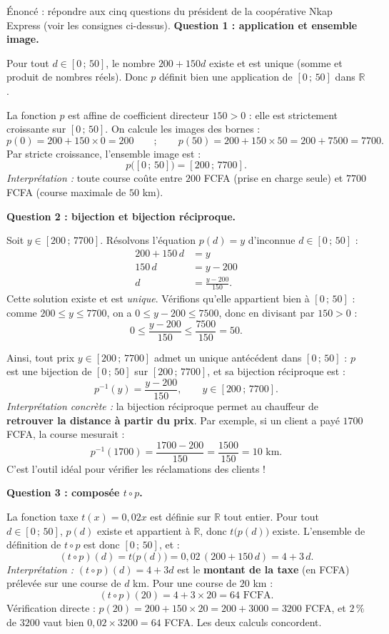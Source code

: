\documentclass[11pt]{article}
\newcommand{\cle}[1]{{\popxbold\color{popdark}#1}}
\begin{document}
\begin{exoresolu}
Énoncé : répondre aux cinq questions du président de la coopérative \og Nkap Express \fg{} (voir les consignes ci-dessus).
\tcblower
\textbf{Question 1 : application et ensemble image.}

Pour tout $d \in [0\,;\,50]$, le nombre $200 + 150d$ existe et est unique (somme et produit de nombres réels). Donc $p$ définit bien une \cle{application} de $[0\,;\,50]$ dans $\mathbb{R}$.

La fonction $p$ est affine de coefficient directeur $150 > 0$ : elle est strictement croissante sur $[0\,;\,50]$. On calcule les images des bornes :
\[ p(0) = 200 + 150 \times 0 = 200 \qquad ; \qquad p(50) = 200 + 150 \times 50 = 200 + 7500 = 7700. \]
Par stricte croissance, l'ensemble image est :
\[ p\bigl([0\,;\,50]\bigr) = [200\,;\,7700]. \]
\emph{Interprétation :} toute course coûte entre $200$ FCFA (prise en charge seule) et $7700$ FCFA (course maximale de $50$ km).

\medskip
\textbf{Question 2 : bijection et bijection réciproque.}

Soit $y \in [200\,;\,7700]$. Résolvons l'équation $p(d) = y$ d'inconnue $d \in [0\,;\,50]$ :
\begin{align*}
200 + 150\,d &= y \\
150\,d &= y - 200 \\
d &= \frac{y - 200}{150}.
\end{align*}
Cette solution existe et est \emph{unique}. Vérifions qu'elle appartient bien à $[0\,;\,50]$ : comme $200 \leq y \leq 7700$, on a $0 \leq y - 200 \leq 7500$, donc en divisant par $150 > 0$ :
\[ 0 \leq \frac{y-200}{150} \leq \frac{7500}{150} = 50. \]

Ainsi, tout prix $y \in [200\,;\,7700]$ admet un unique antécédent dans $[0\,;\,50]$ : $p$ est une \cle{bijection} de $[0\,;\,50]$ sur $[200\,;\,7700]$, et sa bijection réciproque est :
\[ p^{-1}(y) = \frac{y - 200}{150}, \qquad y \in [200\,;\,7700]. \]
\emph{Interprétation concrète :} la bijection réciproque permet au chauffeur de \textbf{retrouver la distance à partir du prix}. Par exemple, si un client a payé $1700$ FCFA, la course mesurait :
\[ p^{-1}(1700) = \frac{1700 - 200}{150} = \frac{1500}{150} = 10 \text{ km}. \]
C'est l'outil idéal pour vérifier les réclamations des clients !

\medskip
\textbf{Question 3 : composée $t \circ p$.}

La fonction taxe $t(x) = 0{,}02x$ est définie sur $\mathbb{R}$ tout entier. Pour tout $d \in [0\,;\,50]$, $p(d)$ existe et appartient à $\mathbb{R}$, donc $t\bigl(p(d)\bigr)$ existe. L'ensemble de définition de $t \circ p$ est donc $[0\,;\,50]$, et :
\[ (t \circ p)(d) = t\bigl(p(d)\bigr) = 0{,}02\,(200 + 150\,d) = 4 + 3\,d. \]
\emph{Interprétation :} $(t \circ p)(d) = 4 + 3d$ est le \textbf{montant de la taxe} (en FCFA) prélevée sur une course de $d$ km. Pour une course de $20$ km :
\[ (t \circ p)(20) = 4 + 3 \times 20 = 64 \text{ FCFA}. \]
Vérification directe : $p(20) = 200 + 150 \times 20 = 200 + 3000 = 3200$ FCFA, et $2\,\%$ de $3200$ vaut bien $0{,}02 \times 3200 = 64$ FCFA. Les deux calculs concordent.


\end{exoresolu}
\end{document}
